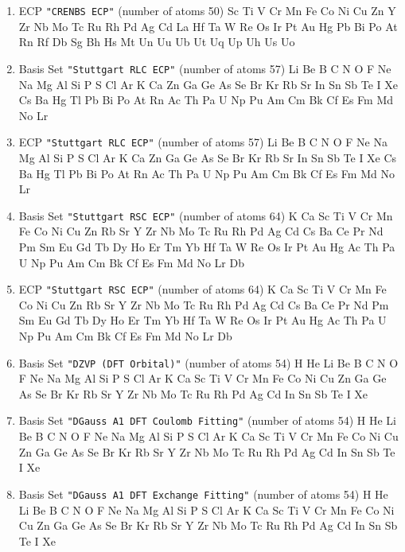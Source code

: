 \begin{enumerate}
\item ECP \verb#"CRENBS ECP"# (number of atoms 50)  \newline 
  Sc Ti V Cr Mn Fe Co Ni Cu Zn Y Zr Nb Mo Tc Ru Rh Pd Ag Cd La Hf Ta W Re
 Os Ir Pt Au Hg Pb Bi Po At Rn Rf Db Sg Bh Hs Mt Un Uu Ub Ut Uq Up Uh Us Uo



\item Basis Set \verb#"Stuttgart RLC ECP"# (number of atoms 57)  \newline 
  Li Be B C N O F Ne Na Mg Al Si P S Cl Ar K Ca Zn Ga Ge As Se Br Kr
 Rb Sr In Sn Sb Te I Xe Cs Ba Hg Tl Pb Bi Po At Rn Ac Th Pa U Np Pu Am Cm
 Bk Cf Es Fm Md No Lr


\item ECP \verb#"Stuttgart RLC ECP"# (number of atoms 57)  \newline 
  Li Be B C N O F Ne Na Mg Al Si P S Cl Ar K Ca Zn Ga Ge As Se Br Kr
 Rb Sr In Sn Sb Te I Xe Cs Ba Hg Tl Pb Bi Po At Rn Ac Th Pa U Np Pu Am Cm
 Bk Cf Es Fm Md No Lr


\item Basis Set \verb#"Stuttgart RSC ECP"# (number of atoms 64)  \newline 
  K Ca Sc Ti V Cr Mn Fe Co Ni Cu Zn Rb Sr Y Zr Nb Mo Tc Ru Rh Pd Ag Cd Cs
 Ba Ce Pr Nd Pm Sm Eu Gd Tb Dy Ho Er Tm Yb Hf Ta W Re Os Ir Pt Au Hg Ac Th
 Pa U Np Pu Am Cm Bk Cf Es Fm Md No Lr Db


\item ECP \verb#"Stuttgart RSC ECP"# (number of atoms 64)  \newline 
  K Ca Sc Ti V Cr Mn Fe Co Ni Cu Zn Rb Sr Y Zr Nb Mo Tc Ru Rh Pd Ag Cd Cs
 Ba Ce Pr Nd Pm Sm Eu Gd Tb Dy Ho Er Tm Yb Hf Ta W Re Os Ir Pt Au Hg Ac Th
 Pa U Np Pu Am Cm Bk Cf Es Fm Md No Lr Db


\item Basis Set \verb#"DZVP (DFT Orbital)"# (number of atoms 54)  \newline 
  H He Li Be B C N O F Ne Na Mg Al Si P S Cl Ar K Ca Sc Ti V Cr Mn
 Fe Co Ni Cu Zn Ga Ge As Se Br Kr Rb Sr Y Zr Nb Mo Tc Ru Rh Pd Ag Cd In Sn
 Sb Te I Xe


\item Basis Set \verb#"DGauss A1 DFT Coulomb Fitting"# (number of atoms 54)  \newline 
  H He Li Be B C N O F Ne Na Mg Al Si P S Cl Ar K Ca Sc Ti V Cr Mn
 Fe Co Ni Cu Zn Ga Ge As Se Br Kr Rb Sr Y Zr Nb Mo Tc Ru Rh Pd Ag Cd In Sn
 Sb Te I Xe


\item Basis Set \verb#"DGauss A1 DFT Exchange Fitting"# (number of atoms 54)  \newline 
  H He Li Be B C N O F Ne Na Mg Al Si P S Cl Ar K Ca Sc Ti V Cr Mn
 Fe Co Ni Cu Zn Ga Ge As Se Br Kr Rb Sr Y Zr Nb Mo Tc Ru Rh Pd Ag Cd In Sn
 Sb Te I Xe



\end{enumerate}
